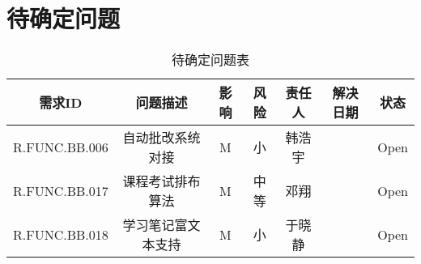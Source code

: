 \chapter{待确定问题}
\begin{table}[htbp]
\centering
\caption{待确定问题表}
\begin{tabular}{|c|c|c|c|c|c|c|}
    \hline
    需求ID & 问题描述 & 影响 & 风险 & 责任人 & 解决日期 & 状态\\
    \hline
    R.FUNC.BB.006 & 自动批改系统对接 & M & 小 & 韩浩宇 &  & Open\\
    \hline
    R.FUNC.BB.017 & 课程考试排布算法 & M & 中等 & 邓翔 &  & Open\\
    \hline
    R.FUNC.BB.018 & 学习笔记富文本支持 & M & 小 & 于晓静 &  & Open\\
    \hline
\end{tabular}
\end{table}
